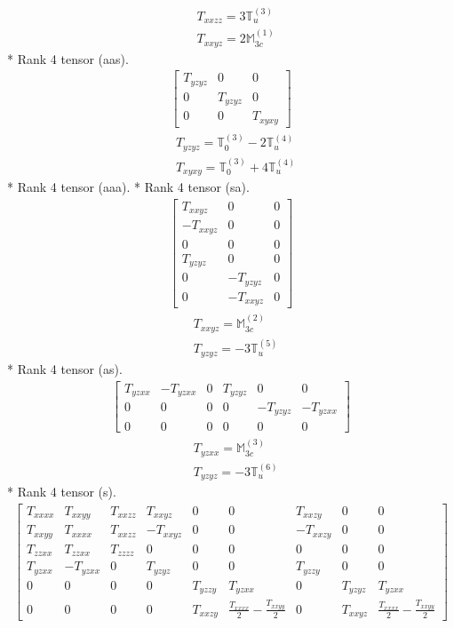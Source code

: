 \documentclass[fleqn,8pt,landscape]{jsarticle}
\begin{document}
\begin{align*}
& T_{xxzz} = 3 \mathbb{T}_{u}^{(3)} \\
& T_{xxyz} = 2 \mathbb{M}_{3c}^{(1)}
\end{align*}
* Rank 4 tensor (aas).
\begin{align*}
\begin{bmatrix} T_{yzyz} & 0 & 0 \\ 0 & T_{yzyz} & 0 \\ 0 & 0 & T_{xyxy} \end{bmatrix}
\end{align*}
\begin{align*}
& T_{yzyz} = \mathbb{T}_{0}^{(3)} - 2 \mathbb{T}_{u}^{(4)} \\
& T_{xyxy} = \mathbb{T}_{0}^{(3)} + 4 \mathbb{T}_{u}^{(4)}
\end{align*}
* Rank 4 tensor (aaa).
* Rank 4 tensor (sa).
\begin{align*}
\begin{bmatrix} T_{xxyz} & 0 & 0 \\ - T_{xxyz} & 0 & 0 \\ 0 & 0 & 0 \\ T_{yzyz} & 0 & 0 \\ 0 & - T_{yzyz} & 0 \\ 0 & - T_{xxyz} & 0 \end{bmatrix}
\end{align*}
\begin{align*}
& T_{xxyz} = \mathbb{M}_{3c}^{(2)} \\
& T_{yzyz} = - 3 \mathbb{T}_{u}^{(5)}
\end{align*}
* Rank 4 tensor (as).
\begin{align*}
\begin{bmatrix} T_{yzxx} & - T_{yzxx} & 0 & T_{yzyz} & 0 & 0 \\ 0 & 0 & 0 & 0 & - T_{yzyz} & - T_{yzxx} \\ 0 & 0 & 0 & 0 & 0 & 0 \end{bmatrix}
\end{align*}
\begin{align*}
& T_{yzxx} = \mathbb{M}_{3c}^{(3)} \\
& T_{yzyz} = - 3 \mathbb{T}_{u}^{(6)}
\end{align*}
* Rank 4 tensor (s).
\begin{align*}
\begin{bmatrix} T_{xxxx} & T_{xxyy} & T_{xxzz} & T_{xxyz} & 0 & 0 & T_{xxzy} & 0 & 0 \\ T_{xxyy} & T_{xxxx} & T_{xxzz} & - T_{xxyz} & 0 & 0 & - T_{xxzy} & 0 & 0 \\ T_{zzxx} & T_{zzxx} & T_{zzzz} & 0 & 0 & 0 & 0 & 0 & 0 \\ T_{yzxx} & - T_{yzxx} & 0 & T_{yzyz} & 0 & 0 & T_{yzzy} & 0 & 0 \\ 0 & 0 & 0 & 0 & T_{yzzy} & T_{yzxx} & 0 & T_{yzyz} & T_{yzxx} \\ 0 & 0 & 0 & 0 & T_{xxzy} & \frac{T_{xxxx}}{2} - \frac{T_{xxyy}}{2} & 0 & T_{xxyz} & \frac{T_{xxxx}}{2} - \frac{T_{xxyy}}{2} \end{bmatrix}
\end{align*}
\end{document}
